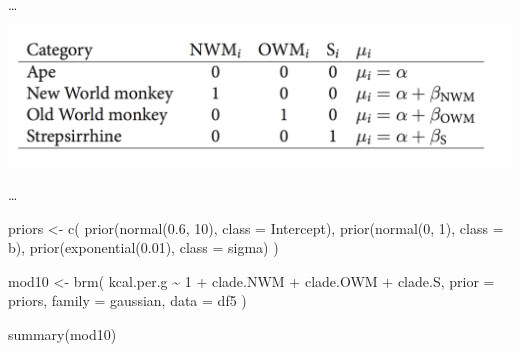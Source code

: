 \documentclass[
  a4paper,11pt,twoside,onecolumn,openright,final,oldfontcommands]{memoir}
\newenvironment{Shaded}{\begin{snugshade}}{\end{snugshade}}
\newcommand{\AttributeTok}[1]{\textcolor[rgb]{0.77,0.63,0.00}{#1}}
\newcommand{\DecValTok}[1]{\textcolor[rgb]{0.00,0.00,0.81}{#1}}
\newcommand{\FloatTok}[1]{\textcolor[rgb]{0.00,0.00,0.81}{#1}}
\newcommand{\FunctionTok}[1]{\textcolor[rgb]{0.00,0.00,0.00}{#1}}
\newcommand{\NormalTok}[1]{#1}
\newcommand{\OtherTok}[1]{\textcolor[rgb]{0.56,0.35,0.01}{#1}}
\newcommand{\SpecialCharTok}[1]{\textcolor[rgb]{0.00,0.00,0.00}{#1}}
\theoremstyle{definition}
\theoremstyle{definition}
\theoremstyle{definition}
\theoremstyle{definition}
\theoremstyle{remark}
\begin{document}
\ldots{}

\begin{center}\includegraphics[width=0.66\linewidth]{figures/table} \end{center}

\ldots{}

\begin{Shaded}
\begin{Highlighting}[]
\NormalTok{priors }\OtherTok{\textless{}{-}} \FunctionTok{c}\NormalTok{(}
  \FunctionTok{prior}\NormalTok{(}\FunctionTok{normal}\NormalTok{(}\FloatTok{0.6}\NormalTok{, }\DecValTok{10}\NormalTok{), }\AttributeTok{class =}\NormalTok{ Intercept),}
  \FunctionTok{prior}\NormalTok{(}\FunctionTok{normal}\NormalTok{(}\DecValTok{0}\NormalTok{, }\DecValTok{1}\NormalTok{), }\AttributeTok{class =}\NormalTok{ b),}
  \FunctionTok{prior}\NormalTok{(}\FunctionTok{exponential}\NormalTok{(}\FloatTok{0.01}\NormalTok{), }\AttributeTok{class =}\NormalTok{ sigma)}
\NormalTok{  )}

\NormalTok{mod10 }\OtherTok{\textless{}{-}} \FunctionTok{brm}\NormalTok{(}
\NormalTok{  kcal.per.g }\SpecialCharTok{\textasciitilde{}} \DecValTok{1} \SpecialCharTok{+}\NormalTok{ clade.NWM }\SpecialCharTok{+}\NormalTok{ clade.OWM }\SpecialCharTok{+}\NormalTok{ clade.S,}
  \AttributeTok{prior =}\NormalTok{ priors,}
  \AttributeTok{family =}\NormalTok{ gaussian,}
  \AttributeTok{data =}\NormalTok{ df5}
\NormalTok{  )}
\end{Highlighting}
\end{Shaded}

\begin{Shaded}
\begin{Highlighting}[]
\FunctionTok{summary}\NormalTok{(mod10)}
\end{Highlighting}
\end{Shaded}
\end{document}
